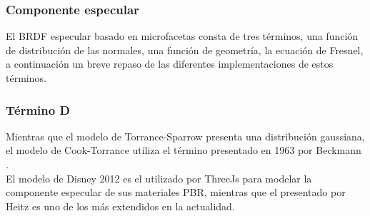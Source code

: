         \subsubsection{Componente especular}
            El BRDF especular basado en microfacetas consta de tres t\'erminos, una funci\'on de distribuci\'on de las normales, una funci\'on
            de geometr\'ia, la ecuaci\'on de Fresnel, a continuaci\'on un breve repaso de las diferentes implementaciones de estos
            t\'erminos.
        


            \subsubsection*{T\'ermino D}
                Mientras que el modelo de Torrance-Sparrow \autocite{torrancesparrow} presenta una distribuci\'on gaussiana, el modelo
                de Cook-Torrance \autocite{cooktorrance} utiliza el t\'ermino presentado en 1963 por Beckmann \autocite{beckmann}.\\

                El modelo de Disney 2012 \autocite{disney12} es el utilizado por ThreeJs para modelar la componente especular de sus
                materiales PBR, mientras que el presentado por Heitz \autocite{ggx} es uno de los m\'as extendidos en la actualidad.\\

